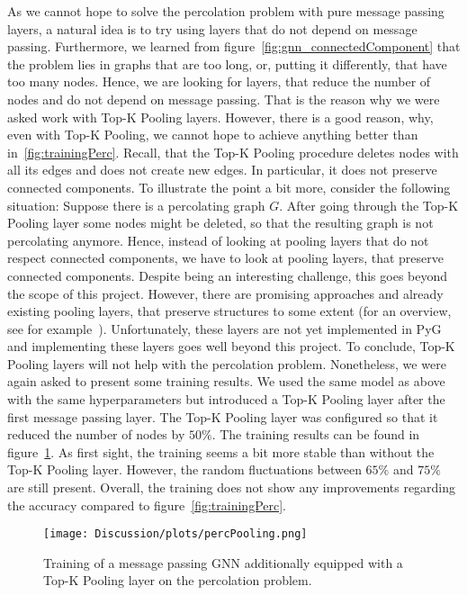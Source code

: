 As we cannot hope to solve the percolation problem with pure message passing layers, 
a natural idea is to try using layers that do not depend on message passing. 
Furthermore, we learned from figure~\ref{fig:gnn_connectedComponent} that the problem lies 
in graphs that are \glqq{}too long\grqq{}, or, putting it differently, that have too many nodes.
Hence, we are looking for layers, that reduce the number of nodes and do not depend on message passing.
That is the reason why we were asked work with Top-K Pooling layers.
However, there is a good reason, why, even with Top-K Pooling, we cannot hope to achieve 
anything better than in~\ref{fig:trainingPerc}.
Recall, that the Top-K Pooling procedure deletes nodes with all its edges and does not create new edges. 
In particular, it does not preserve connected components. To illustrate the point a bit more, 
consider the following situation: Suppose there is a percolating graph $G$. 
After going through the Top-K Pooling layer some nodes might be deleted, 
so that the resulting graph is not percolating anymore. 
Hence, instead of looking at pooling layers that do not respect connected components, we have to look 
at pooling layers, that preserve connected components.
Despite being an interesting challenge, this goes beyond the scope of this project.
However, there are promising approaches and already existing pooling layers, that preserve structures to some extent (for an overview, see for example~\cite{poolingInGNNs}).
Unfortunately, these layers are not yet implemented in PyG and implementing these layers goes well beyond this project.
To conclude, Top-K Pooling layers will not help with the percolation problem. 
Nonetheless, we were again asked to present some training results. We used the same model as above 
with the same hyperparameters but introduced a Top-K Pooling layer after the first message passing layer.
The Top-K Pooling layer was configured so that it reduced the number of nodes by $50\%$.  
The training results can be found in figure~\ref{fig:resTopK}.
As first sight, the training seems a bit more stable than without the Top-K Pooling layer. 
However, the random fluctuations between $65\%$ and $75\%$ are still present. 
Overall, the training does not show any improvements regarding the accuracy compared to figure~\ref{fig:trainingPerc}.
\begin{figure}[h]
    \centering
    \texttt{[image: Discussion/plots/percPooling.png]}
    \caption{Training of a message passing GNN additionally equipped with a Top-K Pooling layer on the percolation problem.}
    \label{fig:resTopK}
\end{figure}
 